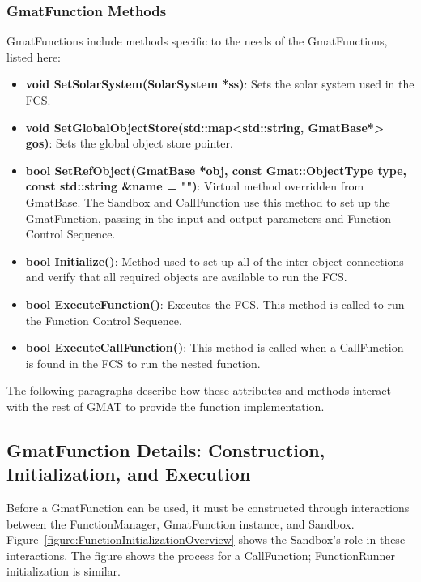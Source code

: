 \subsubsection{GmatFunction Methods}

GmatFunctions include methods specific to the needs of the GmatFunctions, listed here:

\begin{itemize}
\item \textbf{void SetSolarSystem(SolarSystem *ss)}: Sets the solar system used in the FCS.
\item \textbf{void SetGlobalObjectStore(std::map<std::string, GmatBase*> gos)}: Sets the global
object store pointer.
\item \textbf{bool SetRefObject(GmatBase *obj, const Gmat::ObjectType type, const std::string \&name
= "")}: Virtual method overridden from GmatBase.  The Sandbox and CallFunction use this method to
set up the GmatFunction, passing in the input and output parameters and Function Control Sequence.
\item \textbf{bool Initialize()}: Method used to set up all of the inter-object connections and
verify that all required objects are available to run the FCS.
\item \textbf{bool ExecuteFunction()}: Executes the FCS.  This method is called to run the Function
Control Sequence.
\item \textbf{bool ExecuteCallFunction()}:  This method is called when a CallFunction is found in
the FCS to run the nested function.
\end{itemize}

The following paragraphs describe how these attributes and methods interact with the rest of GMAT
to provide the function implementation.

\subsection{\label{section:GmatFunctionFlow}GmatFunction Details: Construction, Initialization, and
Execution}

Before a GmatFunction can be used, it must be constructed through interactions between the
FunctionManager, GmatFunction instance, and Sandbox. 
Figure~\ref{figure:FunctionInitializationOverview} shows the Sandbox's role in these interactions. 
The figure shows the process for a CallFunction; FunctionRunner initialization is similar.

